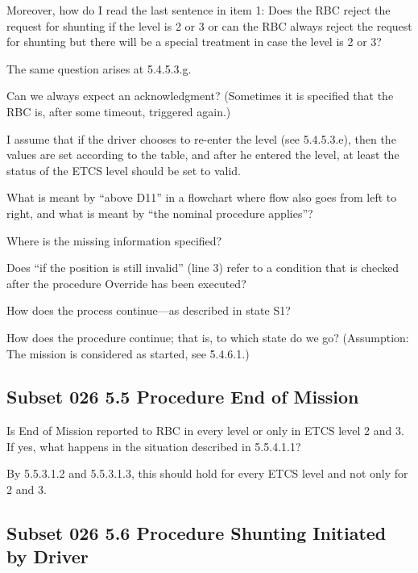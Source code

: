 \documentclass{template/openetcs_article}
\begin{document}
Moreover, how do I read the last sentence in item 1: Does the RBC reject the request for shunting if the level is 2 or 3 or can the RBC always reject the request for shunting but there will be a special treatment in case the level is 2 or 3? 

The same question arises at 5.4.5.3.g.

Can we always expect an acknowledgment? (Sometimes it is specified that the RBC is, after some timeout, triggered again.)

I assume that if the driver chooses to re-enter the level (see 5.4.5.3.e), then the values are set according to the table, and after he entered the level, at least the status of the ETCS level should be set to valid.

What is meant by ``above D11'' in a flowchart where flow also goes from left to right, and what is meant by ``the nominal procedure applies''?

Where is the missing information specified?

Does ``if the position is still invalid'' (line 3) refer to a condition that is checked after the procedure Override has been executed?

How does the process continue---as described in state S1?

How does the procedure continue; that is, to which state do we go? (Assumption: The mission is considered as started, see 5.4.6.1.) 


\subsection{Subset 026 5.5 Procedure End of Mission}

Is End of Mission reported to RBC in every level or only in ETCS level 2 and 3. If yes, what happens in the situation described in 5.5.4.1.1?

By 5.5.3.1.2 and 5.5.3.1.3, this should hold for every ETCS level and not only for 2 and 3. 



\subsection{Subset 026 5.6 Procedure Shunting Initiated by Driver}
\end{document}
